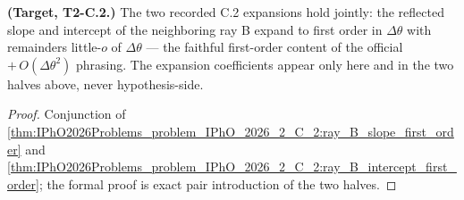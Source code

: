 \begin{theorem}
\label{thm:IPhO2026Problems_problem_IPhO_2026_2_C_2:ray_B_first_order_expansion}
\textbf{(Target, T2-C.2.)}  The two recorded C.2 expansions hold jointly:
the reflected slope and intercept of the neighboring ray B expand to first
order in $\Delta\theta$ with remainders little-$o$ of $\Delta\theta$ ---
the faithful first-order content of the official $+\,O(\Delta\theta^{2})$
phrasing.  The expansion coefficients appear only here and in the two halves
above, never hypothesis-side.
\end{theorem}
\begin{proof}
Conjunction of
\cref{thm:IPhO2026Problems_problem_IPhO_2026_2_C_2:ray_B_slope_first_order}
and
\cref{thm:IPhO2026Problems_problem_IPhO_2026_2_C_2:ray_B_intercept_first_order};
the formal proof is exact pair introduction of the two halves.
\end{proof}
